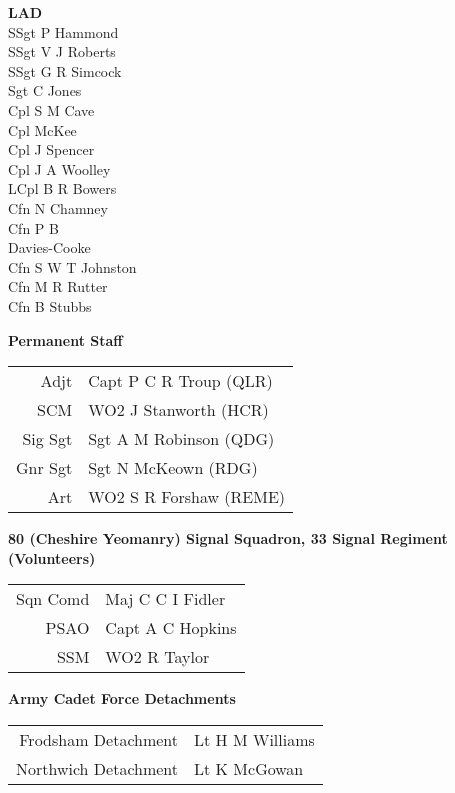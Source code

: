 \begin{multicols}{4}
  \textbf{LAD} \\
  SSgt P Hammond \\
  SSgt V J Roberts \\
  SSgt G R Simcock \\
  Sgt C Jones \\
  Cpl S M Cave \\
  Cpl McKee \\
  Cpl J Spencer \\
  Cpl J A Woolley \\
  LCpl B R Bowers \\
  Cfn N Chamney \\
  Cfn P B \\ \indent Davies-Cooke \\
  Cfn S W T Johnston \\
  Cfn M R Rutter \\
  Cfn B Stubbs \\
\end{multicols}

\pagebreak

\vspace*{20mm}

\begin{center}
  \Large
  \textbf{Permanent Staff}
\end{center}

\begin{center}
  \small
  \begin{tabular}{rl}
    Adjt & Capt P C R Troup (QLR) \\
    SCM & WO2 J Stanworth (HCR) \\
    Sig Sgt & Sgt A M Robinson (QDG) \\
    Gnr Sgt & Sgt N McKeown (RDG) \\
    Art & WO2 S R Forshaw (REME) \\
  \end{tabular}
\end{center}

\vspace*{20mm}

\begin{center}
  \Large
  \textbf{80 (Cheshire Yeomanry) Signal Squadron, 33 Signal Regiment (Volunteers)}
\end{center}

\begin{center}
  \begin{tabular}{rl}
    Sqn Comd & Maj C C I Fidler \\
    PSAO & Capt A C Hopkins \\
    SSM & WO2 R Taylor \\
  \end{tabular}
\end{center}

\vspace*{20mm}

\begin{center}
  \Large
  \textbf{Army Cadet Force Detachments}
\end{center}

\begin{center}
  \begin{tabular}{rl}
    Frodsham Detachment & Lt H M Williams \\
    Northwich Detachment & Lt K McGowan \\
  \end{tabular}
\end{center}

